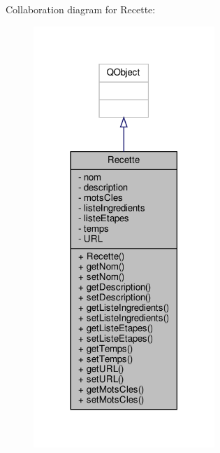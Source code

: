 Collaboration diagram for Recette\+:
\nopagebreak
\begin{figure}[H]
\begin{center}
\leavevmode
\includegraphics[width=194pt]{classRecette__coll__graph}
\end{center}
\end{figure}
